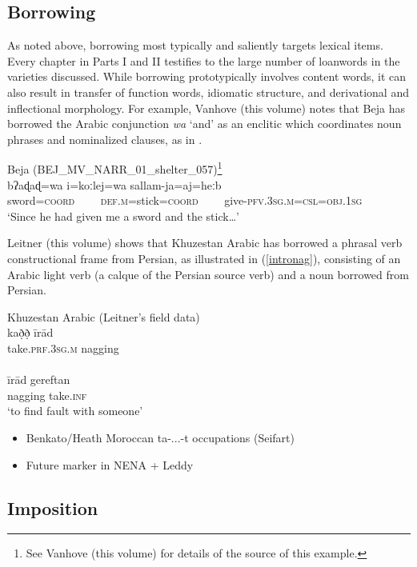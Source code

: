 \documentclass[output=paper]{langsci/langscibook}
\begin{document}
\subsection{Borrowing}

As noted above, borrowing most typically and saliently targets lexical items. Every chapter in Parts I and II testifies to the large number of loanwords in the varieties discussed. While borrowing prototypically involves content words, it can also result in transfer of function words, idiomatic structure, and derivational and inflectional morphology. For example, Vanhove (this volume) notes that Beja has borrowed the Arabic conjunction \textit{wa} `and' as an enclitic which coordinates noun phrases and nominalized clauses, as in .

\ea \label{introsword}
{Beja (BEJ\_MV\_NARR\_01\_shelter\_057)\footnote{See Vanhove (this volume) for details of the source of this example.}}\\
\gll bʔaɖaɖ=wa i=koːlej=wa sallam-ja=aj=heːb\\
     sword=\textsc{coord}~~~~ \textsc{def.m}=stick=\textsc{coord}~~~~ give-\textsc{pfv.3sg.m=csl=obj.1sg}\\
\glt `Since he had given me a sword and the stick…'
\z

Leitner (this volume) shows that Khuzestan Arabic has borrowed a phrasal verb constructional frame from Persian, as illustrated in (\ref{intronag}), consisting of an Arabic light verb (a calque of the Persian source verb) and a noun borrowed from Persian. 

\ea \label{intronag}
\ea Khuzestan Arabic (Leitner's field data)\\
\gll kað̣ð̣ īrād\\
     take.\textsc{prf}.3\textsc{sg}.\textsc{m} nagging\\ 
\\
\gll īrād gereftan\\
     nagging take.\textsc{inf}\\
\glt ‘to find fault with someone’ 
\z
\z

\begin{itemize}
    \item Benkato/Heath Moroccan ta-...-t occupations (Seifart)
    \item Future marker in NENA + Leddy
\end{itemize}

\subsection{Imposition}
\end{document}
